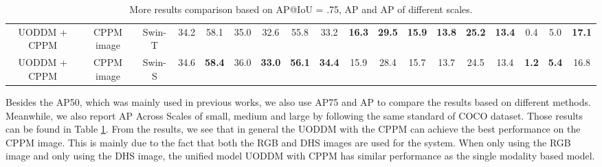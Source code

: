 \documentclass[]{modified_llncs}
\begin{document}
\begin{table}[H]
\begin{center}
{\begin{tabular}{|c|c|c|ccc|ccc|ccc|ccc|ccc|}
\hline\hline
UODDM + CPPM&   CPPM image&     Swin-T& 34.2&   58.1&   35.0&   32.6&   55.8&   33.2&   \textbf{16.3}&   \textbf{29.5}&   \textbf{15.9}&   \textbf{13.8}&   \textbf{25.2}&   \textbf{13.4}&   0.4&    5.0&    \textbf{17.1}\\
UODDM + CPPM&   CPPM image&     Swin-S& 34.6&   \textbf{58.4}&   36.0&   \textbf{33.0}&  \textbf{ 56.1}&   \textbf{34.4}&   15.9&   28.4&   15.7&   13.7&   24.5&   13.4&   \textbf{1.2}&   \textbf{ 5.4}&    16.8\\
\hline
\end{tabular}}
\end{center}
\caption {More results comparison based on AP@IoU = .75, AP and AP of different scales.}
\label{more_2d_res}
\end{table}
Besides the AP50, which was mainly used in previous works, we also use AP75 and AP to compare the results based on different methods. Meanwhile, we also report AP Across Scales of small, medium and large by following the same standard of COCO dataset. Those results can be found in Table \ref{more_2d_res}. From the results, we see that in general the UODDM with the CPPM can achieve the best performance on the CPPM image. This is mainly due to the fact that both the RGB and DHS images are used for the system. When only using the RGB image and only using the DHS image, the unified model UODDM with CPPM has similar performance as the single modality based model.\\
\end{document}
